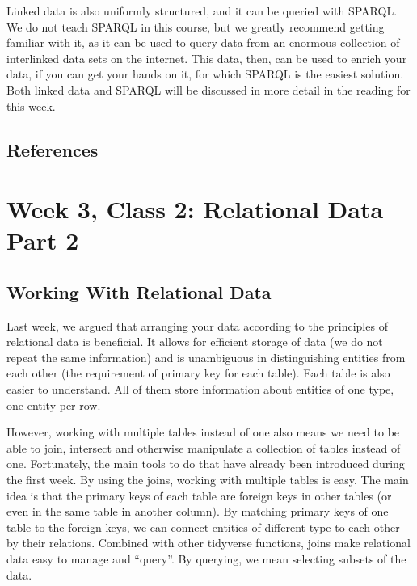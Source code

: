 \documentclass[
]{book}
\begin{document}
Linked data is also uniformly structured, and it can be queried with SPARQL. We do not teach SPARQL in this course, but we greatly recommend getting familiar with it, as it can be used to query data from an enormous collection of interlinked data sets on the internet. This data, then, can be used to enrich your data, if you can get your hands on it, for which SPARQL is the easiest solution. Both linked data
and SPARQL will be discussed in more detail in the reading for this week.

\hypertarget{references-2}{%
\section{References}\label{references-2}}

\hypertarget{week-3-class-2-relational-data-part-2}{%
\chapter{Week 3, Class 2: Relational Data Part 2}\label{week-3-class-2-relational-data-part-2}}

\hypertarget{working-with-relational-data}{%
\section{Working With Relational Data}\label{working-with-relational-data}}

Last week, we argued that arranging your data according to the principles of relational data is beneficial.
It allows for efficient storage of data (we do not repeat the same information) and is unambiguous in distinguishing
entities from each other (the requirement of primary key for each table). Each table is also easier to understand.
All of them store information about entities of one type, one entity per row.

However, working with multiple tables instead of one also means we need to be able to join, intersect and otherwise manipulate a collection of tables instead of one. Fortunately, the main tools to do that have already been introduced during the first week.
By using the joins, working with multiple tables is easy. The main idea is that the primary keys of each table are foreign keys in other tables (or even in the same table in another column). By matching primary keys of one table to the foreign keys, we can connect entities of different type to each other by their relations. Combined with other tidyverse functions, joins make relational data easy to manage and ``query''. By querying, we mean selecting subsets of the data.
\end{document}
